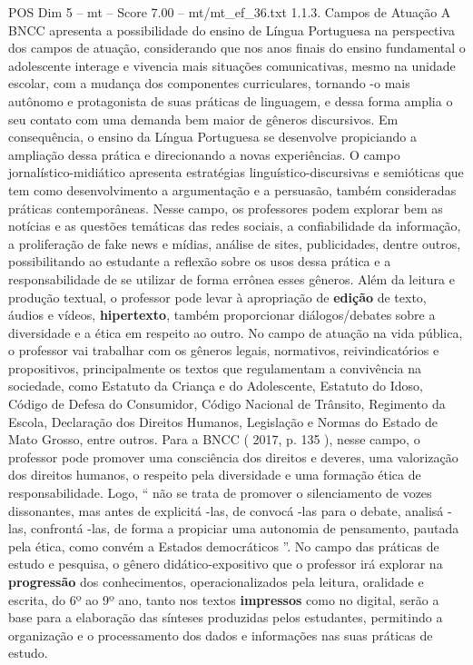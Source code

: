 \begin{textsample}{POS Dim 5 – mt – Score 7.00 – mt/mt\_ef\_36.txt}  \label{ex:f5_pos_089}
1.1.3.
Campos de Atuação A BNCC apresenta a possibilidade do ensino de Língua Portuguesa na perspectiva dos campos de atuação, considerando que nos anos finais do ensino fundamental o adolescente interage e vivencia mais situações comunicativas, mesmo na unidade escolar, com a mudança dos componentes curriculares, tornando -o mais autônomo e protagonista de suas práticas de linguagem, e dessa forma amplia o seu contato com uma demanda bem maior de gêneros discursivos.
Em consequência, o ensino da Língua Portuguesa se desenvolve propiciando a ampliação dessa prática e direcionando a novas experiências.
O campo jornalístico-midiático apresenta estratégias linguístico-discursivas e semióticas que tem como desenvolvimento a argumentação e a persuasão, também consideradas práticas contemporâneas.
Nesse campo, os professores podem explorar bem as notícias e as questões temáticas das redes sociais, a confiabilidade da informação, a proliferação de fake news e mídias, análise de sites, publicidades, dentre outros, possibilitando ao estudante a reflexão sobre os usos dessa prática e a responsabilidade de se utilizar de forma errônea esses gêneros.
Além da leitura e produção textual, o professor pode levar à apropriação de \textbf{edição} de texto, áudios e vídeos, \textbf{hipertexto}, também proporcionar diálogos/debates sobre a diversidade e a ética em respeito ao outro.
No campo de atuação na vida pública, o professor vai trabalhar com os gêneros legais, normativos, reivindicatórios e propositivos, principalmente os textos que regulamentam a convivência na sociedade, como Estatuto da Criança e do Adolescente, Estatuto do Idoso, Código de Defesa do Consumidor, Código Nacional de Trânsito, Regimento da Escola, Declaração dos Direitos Humanos, Legislação e Normas do Estado de Mato Grosso, entre outros.
Para a BNCC ( 2017, p. 135 ), nesse campo, o professor pode promover uma consciência dos direitos e deveres, uma valorização dos direitos humanos, o respeito pela diversidade e uma formação ética de responsabilidade.
Logo, “ não se trata de promover o silenciamento de vozes dissonantes, mas antes de explicitá -las, de convocá -las para o debate, analisá -las, confrontá -las, de forma a propiciar uma autonomia de pensamento, pautada pela ética, como convém a Estados democráticos ”.
No campo das práticas de estudo e pesquisa, o gênero didático-expositivo que o professor irá explorar na \textbf{progressão} dos conhecimentos, operacionalizados pela leitura, oralidade e escrita, do 6º ao 9º ano, tanto nos textos \textbf{impressos} como no digital, serão a base para a elaboração das sínteses produzidas pelos estudantes, permitindo a organização e o processamento dos dados e informações nas suas práticas de estudo.

\end{textsample}
